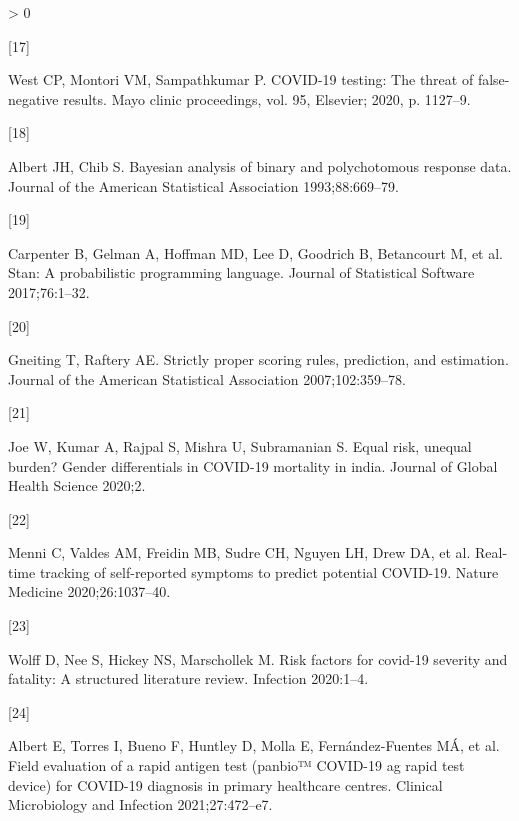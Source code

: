 \documentclass[]{elsarticle} %
\newlength{\cslhangindent}
\newlength{\csllabelwidth}
\newenvironment{CSLReferences}[2] %
 {%
  \setlength{\parindent}{0pt}
  \ifodd #1 \everypar{\setlength{\hangindent}{\cslhangindent}}\ignorespaces\fi
  \ifnum #2 > 0
  \setlength{\parskip}{#2\baselineskip}
  \fi
 }%
 {}
\newcommand{\CSLLeftMargin}[1]{\parbox[t]{\csllabelwidth}{#1}}
\newcommand{\CSLRightInline}[1]{\parbox[t]{\linewidth - \csllabelwidth}{#1}\break}
\begin{document}
\begin{CSLReferences}{0}{0}
\leavevmode\hypertarget{ref-west2020covid}{}%
\CSLLeftMargin{{[}17{]} }
\CSLRightInline{West CP, Montori VM, Sampathkumar P. COVID-19 testing: The threat of false-negative results. Mayo clinic proceedings, vol. 95, Elsevier; 2020, p. 1127--9.}

\leavevmode\hypertarget{ref-albert1993bayesian}{}%
\CSLLeftMargin{{[}18{]} }
\CSLRightInline{Albert JH, Chib S. Bayesian analysis of binary and polychotomous response data. Journal of the American Statistical Association 1993;88:669--79.}

\leavevmode\hypertarget{ref-carpenter2017stan}{}%
\CSLLeftMargin{{[}19{]} }
\CSLRightInline{Carpenter B, Gelman A, Hoffman MD, Lee D, Goodrich B, Betancourt M, et al. Stan: A probabilistic programming language. Journal of Statistical Software 2017;76:1--32.}

\leavevmode\hypertarget{ref-gneiting2007strictly}{}%
\CSLLeftMargin{{[}20{]} }
\CSLRightInline{Gneiting T, Raftery AE. Strictly proper scoring rules, prediction, and estimation. Journal of the American Statistical Association 2007;102:359--78.}

\leavevmode\hypertarget{ref-joe2020equal}{}%
\CSLLeftMargin{{[}21{]} }
\CSLRightInline{Joe W, Kumar A, Rajpal S, Mishra U, Subramanian S. Equal risk, unequal burden? Gender differentials in COVID-19 mortality in india. Journal of Global Health Science 2020;2.}

\leavevmode\hypertarget{ref-menni2020real}{}%
\CSLLeftMargin{{[}22{]} }
\CSLRightInline{Menni C, Valdes AM, Freidin MB, Sudre CH, Nguyen LH, Drew DA, et al. Real-time tracking of self-reported symptoms to predict potential COVID-19. Nature Medicine 2020;26:1037--40.}

\leavevmode\hypertarget{ref-wolff2020risk}{}%
\CSLLeftMargin{{[}23{]} }
\CSLRightInline{Wolff D, Nee S, Hickey NS, Marschollek M. Risk factors for covid-19 severity and fatality: A structured literature review. Infection 2020:1--4.}

\leavevmode\hypertarget{ref-albert2021field}{}%
\CSLLeftMargin{{[}24{]} }
\CSLRightInline{Albert E, Torres I, Bueno F, Huntley D, Molla E, Fernández-Fuentes MÁ, et al. Field evaluation of a rapid antigen test (panbio™ COVID-19 ag rapid test device) for COVID-19 diagnosis in primary healthcare centres. Clinical Microbiology and Infection 2021;27:472--e7.}

\end{CSLReferences}
\end{document}
